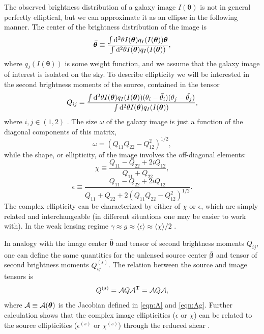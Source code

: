 The observed brightness distribution of a galaxy image $I(\bm{\theta})$ is not in general perfectly elliptical, but we can approximate it as an ellipse in the following manner. The center of the brightness distribution of the image is
\begin{equation}
\bm{\bar{\theta}} \equiv \frac{\int {\rm d}^2\theta I(\bm{\theta}) q_I( I(\bm{\theta})) \bm{\theta}}{\int {\rm d}^2\theta I(\bm{\theta}) q_I( I(\bm{\theta}))},
\end{equation}
where $q_I( I(\bm{\theta}))$ is some weight function, and we assume that the galaxy image of interest is isolated on the sky. To describe ellipticity we will be interested in the second brightness moments of the source, contained in the tensor
\begin{equation}
Q_{ij} = \frac{\int {\rm d}^2\theta I(\bm{\theta}) q_I( I(\bm{\theta})) (\theta_i - \bar{\theta_i})(\theta_j - \bar{\theta_j})}{\int {\rm d}^2\theta I(\bm{\theta}) q_I( I(\bm{\theta}))},
\end{equation}
where $i,j \in (1,2)$ \citep{Schneider06_WeakGravLens}. The size $\omega$ of the galaxy image is just a function of the diagonal components of this matrix,
\begin{equation} 
\omega = (Q_{11}Q_{22} - Q_{12}^2)^{1/2},
\end{equation}
while the shape, or ellipticity, of the image involves the off-diagonal elements:
\begin{equation} 
\chi \equiv \frac{Q_{11} - Q_{22} + 2i Q_{12}}{Q_{11} + Q_{22}} ,
\end{equation}
\begin{equation} 
\epsilon \equiv \frac{Q_{11} - Q_{22} + 2i Q_{12}}{Q_{11} + Q_{22} + 2(Q_{11}Q_{22} - Q_{12}^2)^{1/2}}.
\end{equation}
The complex ellipticity can be characterized by either of $\chi$ or $\epsilon$, which are simply related and interchangeable (in different situations one may be easier to work with). In the weak lensing regime $\gamma \approx g \approx \langle \epsilon \rangle \approx  \langle \chi \rangle /2$ \citep{BS01}. 

In analogy with the image center $\bm{\bar{\theta}}$ and tensor of second brightness moments $Q_{ij}$, one can define the same quantities for the unlensed source center $\bm{\bar{\beta}}$ and tensor of second brightness moments $Q_{ij}^{(s)}$. The relation between the source and image tensors is
\begin{equation}
Q^{(s)} = {\cal A} Q {\cal A}^{\rm T} = {\cal A} Q {\cal A},
\end{equation}
where ${\cal A} \equiv {\cal A}(\bm{\theta})$ is the Jacobian defined in \autoref{eqn:A} and \autoref{eqn:Ag}. Further calculation shows that the complex image ellipticities ($\epsilon$ or $\chi$) can be related to the source ellipticities ($\epsilon^{(s)}$ or $\chi^{(s)}$) through the reduced shear \citep{BS01}.

